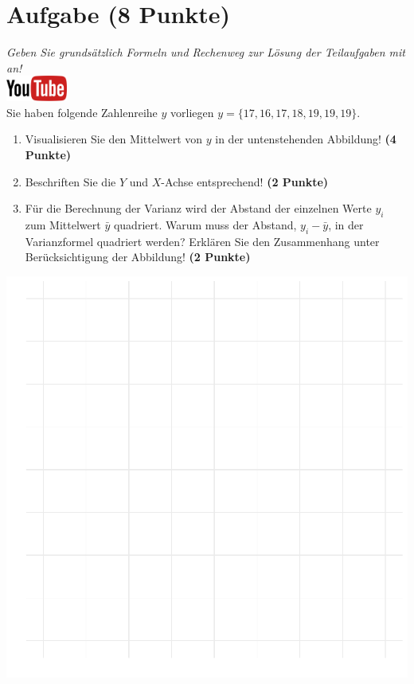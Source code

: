 \documentclass[a4paper, 9pt]{scrartcl}\usepackage[]{graphicx}\usepackage[]{xcolor}
\makeatletter
\def\maxwidth{ %
  \ifdim\Gin@nat@width>\linewidth
    \linewidth
  \else
    \Gin@nat@width
  \fi
}
\makeatother
\begin{document}
 
\clearpage

\section{Aufgabe \hfill (8 Punkte)}

\textit{Geben Sie grunds{\"a}tzlich Formeln und Rechenweg zur L{\"o}sung der
  Teilaufgaben mit an!} \\[1Ex]

\hfill\href{https://youtu.be/oMdtYbDInYE}{\includegraphics[width =
  2cm]{img/youtube}}\\[1Ex]

Sie haben folgende Zahlenreihe $y$ vorliegen
$y = \{17, 16, 17, 18, 19, 19, 19\}$.

\begin{enumerate}
\item Visualisieren Sie den Mittelwert von $y$ in der untenstehenden
  Abbildung! \textbf{(4 Punkte)}
\item Beschriften Sie die $Y$ und $X$-Achse entsprechend! \textbf{(2 Punkte)}
\item F{\"u}r die Berechnung der Varianz wird der Abstand der einzelnen Werte $y_i$
  zum Mittelwert $\bar{y}$ quadriert. Warum muss der Abstand, $y_i -
  \bar{y}$, in der Varianzformel quadriert werden?
  Erkl{\"a}ren Sie den Zusammenhang unter Ber{\"u}cksichtigung der Abbildung!
  \textbf{(2 Punkte)}  
\end{enumerate}



{\centering \includegraphics[width=\maxwidth]{img/desc-01-1} 

}
\end{document}
